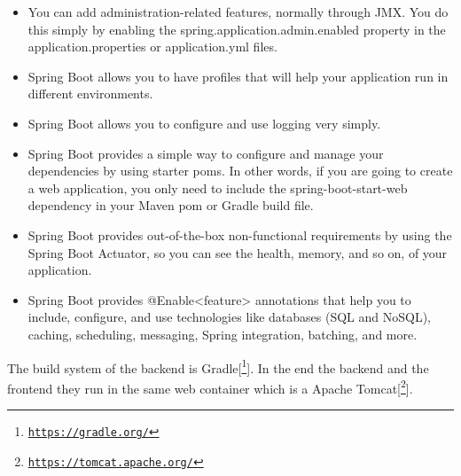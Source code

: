 \begin{itemize}
	\item You can add administration-related features, normally through JMX. You do this simply by enabling the  spring.application.admin.enabled  property in the application.properties  or  application.yml files.
	
	\item Spring Boot allows you to have profiles that will help your application run in different environments. 
	
	\item Spring Boot allows you to configure and use logging very simply.  
	
	\item Spring Boot provides a simple way to configure and manage your dependencies by using starter poms. In other words, if you are going to create a web application, you only need to include the  spring-boot-start-web  dependency in your Maven pom or Gradle build file. 
	
	\item Spring Boot provides out-of-the-box non-functional requirements by using the Spring Boot Actuator, so you can see the health, memory, and so on, of your application. 
	
	\item Spring Boot provides  @Enable<feature>  annotations that help you to include, configure, and use technologies like databases (SQL and NoSQL), caching, scheduling, messaging, Spring integration, batching, and more.       
\end{itemize}
The build system of the backend is Gradle[\footnote{\href{https://gradle.org/}{\texttt{https://gradle.org/}}}]. In the end the backend and the frontend they run in the same web container which is a Apache Tomcat[\footnote{\href{https://tomcat.apache.org/}{\texttt{https://tomcat.apache.org/}}}].
\newline

